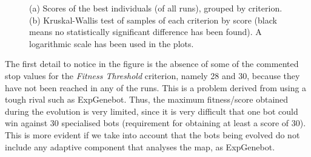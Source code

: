 \documentclass[runningheads,a4paper]{llncs}
\begin{document}
\begin{figure}
\begin{center}
\end{center} 
\caption{(a) Scores of the best individuals (of all runs), grouped by criterion. (b) Kruskal-Wallis test of samples of each criterion by score (black means no statistically significant difference has been found). A logarithmic scale has been used in the plots.}
\label{fig:boxplotscore}
\end{figure}



The first detail to notice in the figure is the absence of some of the commented stop values for the \textit{Fitness Threshold} criterion, namely 28 and 30, because they have not been reached in any of the runs.
This is a problem derived from using a tough rival such as ExpGenebot. Thus, the maximum fitness/score obtained during the evolution is very limited, since it is very difficult that one bot could win against 30 specialised bots \cite{Wolpert97nofree} (requirement for obtaining at least a score of 30). This is more evident if we take into account that the bots being evolved do not include any adaptive component that analyses the map, as ExpGenebot.%
\end{document}
